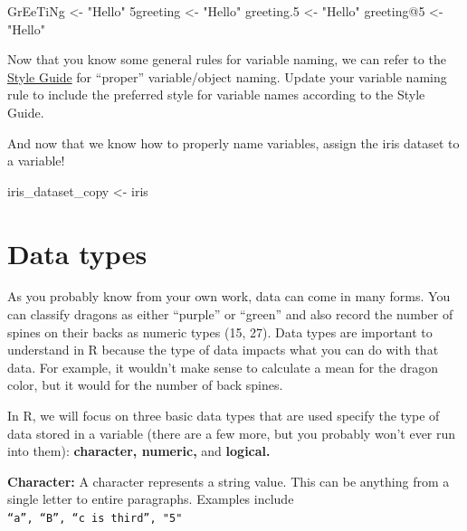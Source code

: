 \documentclass[
  letterpaper,
  DIV=11,
  numbers=noendperiod]{scrreprt}
\newenvironment{Shaded}{\begin{snugshade}}{\end{snugshade}}
\newcommand{\DecValTok}[1]{\textcolor[rgb]{0.68,0.00,0.00}{#1}}
\newcommand{\FloatTok}[1]{\textcolor[rgb]{0.68,0.00,0.00}{#1}}
\newcommand{\NormalTok}[1]{\textcolor[rgb]{0.00,0.23,0.31}{#1}}
\newcommand{\OtherTok}[1]{\textcolor[rgb]{0.00,0.23,0.31}{#1}}
\newcommand{\SpecialCharTok}[1]{\textcolor[rgb]{0.37,0.37,0.37}{#1}}
\newcommand{\StringTok}[1]{\textcolor[rgb]{0.13,0.47,0.30}{#1}}
\begin{document}
\begin{Shaded}
\begin{Highlighting}[]
\NormalTok{GrEeTiNg }\OtherTok{\textless{}{-}} \StringTok{"Hello"}
\DecValTok{5}\NormalTok{greeting }\OtherTok{\textless{}{-}} \StringTok{"Hello"}
\NormalTok{greeting}\FloatTok{.5} \OtherTok{\textless{}{-}} \StringTok{"Hello"}
\NormalTok{greeting}\SpecialCharTok{@}\DecValTok{5} \OtherTok{\textless{}{-}} \StringTok{"Hello"}
\end{Highlighting}
\end{Shaded}

Now that you know some general rules for variable naming, we can refer
to the \href{https://style.tidyverse.org/syntax.html\#syntax}{Style
Guide} for ``proper'' variable/object naming. Update your variable
naming rule to include the preferred style for variable names according
to the Style Guide.

And now that we know how to properly name variables, assign the iris
dataset to a variable!

\begin{Shaded}
\begin{Highlighting}[]
\NormalTok{iris\_dataset\_copy }\OtherTok{\textless{}{-}}\NormalTok{ iris}
\end{Highlighting}
\end{Shaded}

\section{Data types}\label{data-types}

As you probably know from your own work, data can come in many forms.
You can classify dragons as either ``purple'' or ``green'' and also
record the number of spines on their backs as numeric types (15, 27).
Data types are important to understand in R because the type of data
impacts what you can do with that data. For example, it wouldn't make
sense to calculate a mean for the dragon color, but it would for the
number of back spines.

In R, we will focus on three basic data types that are used specify the
type of data stored in a variable (there are a few more, but you
probably won't ever run into them): \textbf{character, numeric,} and
\textbf{logical.}

\textbf{Character:} A character represents a string value. This can be
anything from a single letter to entire paragraphs. Examples include
\texttt{“a”,\ “B”,\ “c\ is\ third”,\ "5"}
\end{document}
